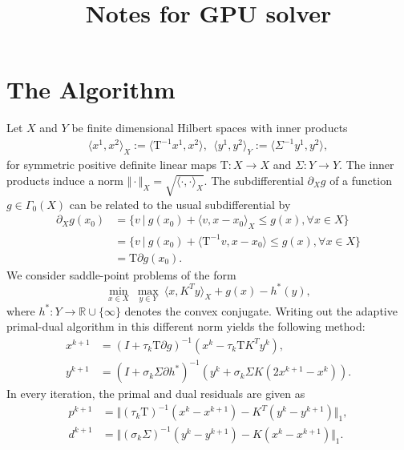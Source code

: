 \documentclass[A4,12pt]{article}
\title{Notes for GPU solver}
\date{}
\newcommand{\bbRext}{\mathbb{R} \cup \{ \infty \} }
\newcommand{\rslv}[1]{(I + #1)^{-1}}
\newcommand{\norm}[1]{\Vert #1 \Vert}
\providecommand{\iprod}[2]{\langle#1,#2\rangle}
\newcommand{\Tau}{\mathrm{T}}
\begin{document}
\maketitle

\section{The Algorithm}
Let $X$ and $Y$ be finite dimensional Hilbert spaces with inner products
\begin{equation}
  \begin{aligned}
    \iprod{x^1}{x^2}_X := \iprod{\Tau^{-1} x^1}{x^2}, ~~
    \iprod{y^1}{y^2}_Y := \iprod{\Sigma^{-1} y^1}{y^2},
  \end{aligned}
\end{equation}
for symmetric positive definite linear maps $\Tau : X \rightarrow X$ and $\Sigma : Y \rightarrow Y$. The inner products induce a norm $\norm{\cdot}_X = \sqrt{\iprod{\cdot}{\cdot}_X}$. The subdifferential $\partial_X g$ of a function $g \in \Gamma_0(X)$ can be related to the usual subdifferential by 
\begin{equation}
  \begin{aligned}
    \partial_X g(x_0) &= \{ v ~|~ g(x_0) + \iprod{v}{x - x_0}_X \leq g(x), \forall x \in X\}\\
&=  \{ v ~|~ g(x_0) + \iprod{\Tau^{-1}v}{x - x_0} \leq g(x), \forall x \in X\} \\
&= \Tau \partial g(x_0).
  \end{aligned}
\end{equation}
We consider saddle-point problems of the form
\begin{equation}
  \underset{x \in X} \min ~ \underset{y \in Y} \max ~ \iprod{x}{K^T y}_X + g(x) - h^*(y),
\end{equation}
where $h^* : Y \rightarrow \bbRext$ denotes the convex conjugate. Writing out the adaptive primal-dual algorithm in this different norm yields the following method:
\begin{equation} 
  \begin{aligned}
    x^{k+1} &= \rslv{\tau_k \Tau \partial g}(x^k - \tau_k \Tau K^T y^k),\\
    y^{k+1} &= \rslv{\sigma_k \Sigma \partial h^*}(y^k + \sigma_k \Sigma K (2x^{k+1} - x^k)).
  \end{aligned}
\end{equation}
In every iteration, the primal and dual residuals are given as
\begin{equation} 
  \begin{aligned}
    p^{k+1} &= \norm{ (\tau_k \Tau)^{-1} (x^k - x^{k+1}) - K^T (y^k - y^{k+1})}_1,\\
    d^{k+1} &= \norm{ (\sigma_k \Sigma)^{-1} (y^k - y^{k+1}) - K (x^k - x^{k+1})}_1.
  \end{aligned}
\end{equation}
\end{document}
